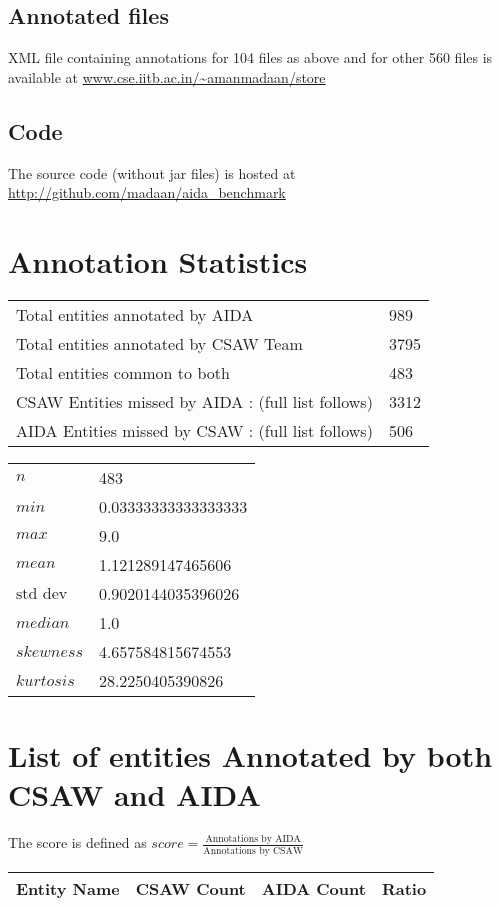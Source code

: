 \documentclass[a4paper,10pt]{article}
\begin{document}
\subsection{Annotated files}
XML file containing annotations for 104 files as above and for other 560 files is available at 
\url{www.cse.iitb.ac.in/~amanmadaan/store}

\subsection{Code}
The source code (without jar files) is hosted at \url{http://github.com/madaan/aida_benchmark}
\newpage
\section{Annotation Statistics}
\begin{center}
\bigskip \bigskip \bigskip \bigskip

\begin{tabular}{|l|l|}
 \hline
Total entities annotated by AIDA & 989\\ 
Total entities annotated by CSAW Team & 3795\\ 
Total entities common to both & 483\\ 
CSAW Entities missed by AIDA : (full list follows)  & 3312\\ 
AIDA Entities missed by CSAW : (full list follows)  & 506\\ 
\hline
\end{tabular}
\end{center}

\bigskip 
\bigskip \bigskip 
\begin{center}

\begin{tabular}{|l|l|}
 \hline
$n$ & 483\\ 
$min$ & 0.03333333333333333\\ 
$max$ & 9.0\\ 
$mean$ & 1.121289147465606\\ 
$\text{std dev}$ & 0.9020144035396026\\ 
$median$ & 1.0\\ 
$skewness$ & 4.657584815674553\\ 
$kurtosis$ & 28.2250405390826\\ 
\hline
\end{tabular}
\end{center}

\newpage
\section{List of entities Annotated by both CSAW and AIDA}
The score is defined as $score = \frac{\text{Annotations by AIDA}}{\text{Annotations by CSAW}}$
\begin{longtable}{l|l|l|l}
\hline
Entity Name & CSAW Count & AIDA Count & Ratio \\
\hline

\hline
\end{longtable}
\end{document}
